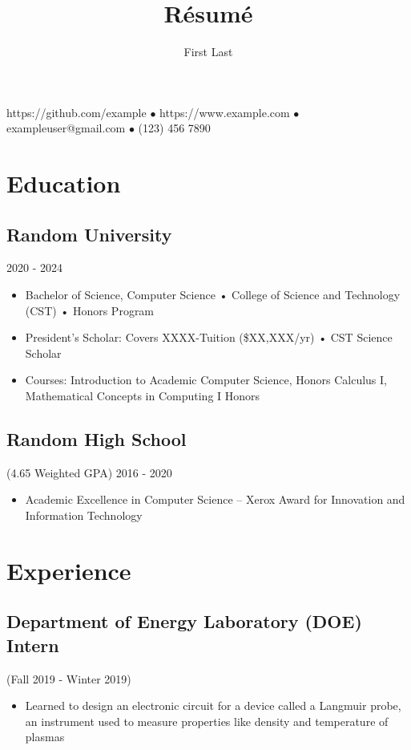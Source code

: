 \documentclass{article}
\makeatletter
\renewcommand{\maketitle}{
    \begin{center}
        {\huge\bfseries
        \theauthor}
    \end{center}
    \begin{center}
        \vspace{1em}
        \leavevmode
        https://github.com/example $\bullet$ https://www.example.com $\bullet$ exampleuser@gmail.com $\bullet$ (123) 456 7890
    \end{center}
}
\makeatother
\begin{document}
\title{R\'esum\'e}
\author{First Last}

\maketitle
\section{Education}
\subsection{Random University}\hspace{31em} 2020 - 2024
\begin{itemize}
    \item Bachelor of Science, Computer Science • College of Science and Technology (CST) • Honors Program
    \item President's Scholar: Covers XXXX-Tuition (\$XX,XXX/yr) • CST Science Scholar
    \item Courses: Introduction to Academic Computer Science, Honors Calculus I, Mathematical Concepts in Computing I Honors 
\end{itemize}

\subsection{Random High School}(4.65 Weighted GPA)\hspace{19em} 2016 - 2020
\begin{itemize}
    \item Academic Excellence in Computer Science -- Xerox Award for Innovation and Information Technology
\end{itemize}

\section{Experience}
\subsection{Department of Energy Laboratory (DOE) Intern} (Fall 2019 - Winter 2019)
\begin{itemize}
    \item Learned to design an electronic circuit for a device called a Langmuir probe, an instrument used to measure properties like density and temperature of plasmas
\end{itemize}
\end{document}
